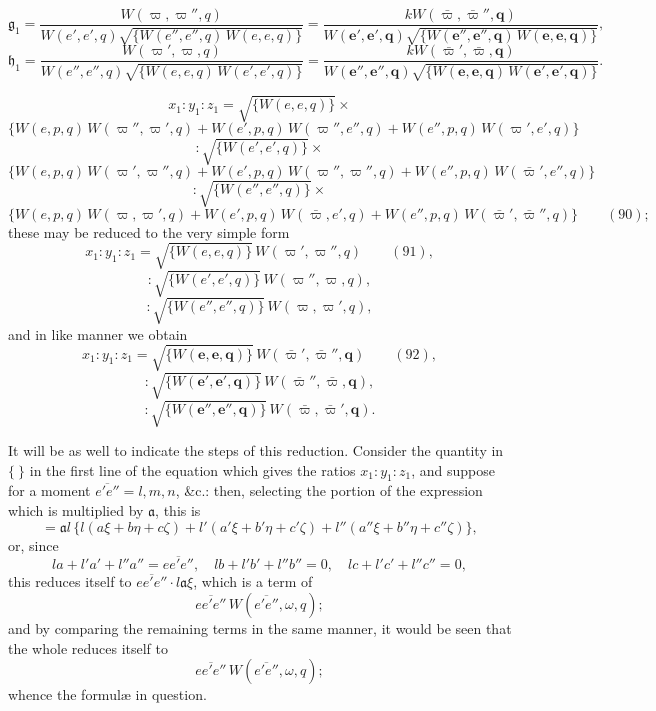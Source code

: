 \documentclass[11pt]{article}
\begin{document}
\[
\mathfrak{g}_1 = \frac{W(\varpi, \varpi'', q)}{W(e', e', q)\sqrt{\{W(e'', e'', q)\,W(e, e, q)\}}} = \frac{kW(\bar\varpi, \bar\varpi'', \mathbf{q})}{W(\mathbf{e}', \mathbf{e}', \mathbf{q})\sqrt{\{W(\mathbf{e}'', \mathbf{e}'', \mathbf{q})\,W(\mathbf{e}, \mathbf{e}, \mathbf{q})\}}},
\]
\[
\mathfrak{h}_1 = \frac{W(\varpi', \varpi, q)}{W(e'', e'', q)\sqrt{\{W(e, e, q)\,W(e', e', q)\}}} = \frac{kW(\bar\varpi', \bar\varpi, \mathbf{q})}{W(\mathbf{e}'', \mathbf{e}'', \mathbf{q})\sqrt{\{W(\mathbf{e}, \mathbf{e}, \mathbf{q})\,W(\mathbf{e}', \mathbf{e}', \mathbf{q})\}}}.
\]

\newpage
\setcounter{page}{222}

\[
x_1 : y_1 : z_1 = \sqrt{\{W(e, e, q)\}} \times
\]
\[
\{W(e, p, q)\,W(\varpi'', \varpi', q) + W(e', p, q)\,W(\varpi'', e'', q) + W(e'', p, q)\,W(\varpi', e', q)\}
\]
\[
: \sqrt{\{W(e', e', q)\}} \times
\]
\[
\{W(e, p, q)\,W(\varpi', \varpi'', q) + W(e', p, q)\,W(\varpi'', \varpi'', q) + W(e'', p, q)\,W(\bar\varpi', e'', q)\}
\]
\[
: \sqrt{\{W(e'', e'', q)\}} \times
\]
\[
\{W(e, p, q)\,W(\varpi, \varpi', q) + W(e', p, q)\,W(\bar\varpi, e', q) + W(e'', p, q)\,W(\bar\varpi', \bar\varpi'', q)\} \qquad (90);
\]
these may be reduced to the very simple form
\[
x_1 : y_1 : z_1 = \sqrt{\{W(e, e, q)\}}\,W(\varpi', \varpi'', q) \qquad (91),
\]
\[
: \sqrt{\{W(e', e', q)\}}\,W(\varpi'', \varpi, q),
\]
\[
: \sqrt{\{W(e'', e'', q)\}}\,W(\varpi, \varpi', q),
\]
and in like manner we obtain
\[
x_1 : y_1 : z_1 = \sqrt{\{W(\mathbf{e}, \mathbf{e}, \mathbf{q})\}}\,W(\bar\varpi', \bar\varpi'', \mathbf{q}) \qquad (92),
\]
\[
: \sqrt{\{W(\mathbf{e}', \mathbf{e}', \mathbf{q})\}}\,W(\bar\varpi'', \bar\varpi, \mathbf{q}),
\]
\[
: \sqrt{\{W(\mathbf{e}'', \mathbf{e}'', \mathbf{q})\}}\,W(\bar\varpi, \bar\varpi', \mathbf{q}).
\]

It will be as well to indicate the steps of this reduction. Consider the quantity in $\{\ \}$ in the first line of the equation which gives the ratios $x_1 : y_1 : z_1$, and suppose for a moment $\overline{e'e''} = l, m, n$, \&c.: then, selecting the portion of the expression which is multiplied by $\mathfrak{a}$, this is
\[
= \mathfrak{a}l\,\{l(a\xi + b\eta + c\zeta) + l'(a'\xi + b'\eta + c'\zeta) + l''(a''\xi + b''\eta + c''\zeta)\},
\]
or, since
\[
la + l'a' + l''a'' = \overline{ee'e''},\quad lb + l'b' + l''b'' = 0,\quad lc + l'c' + l''c'' = 0,
\]
this reduces itself to $\overline{ee'e''}\cdot l\mathfrak{a}\xi$, which is a term of
\[
\overline{ee'e''}\,W(\overline{e'e''}, \omega, q);
\]
and by comparing the remaining terms in the same manner, it would be seen that the whole reduces itself to
\[
\overline{ee'e''}\,W(\overline{e'e''}, \omega, q);
\]
whence the formul\ae{} in question.
\end{document}
